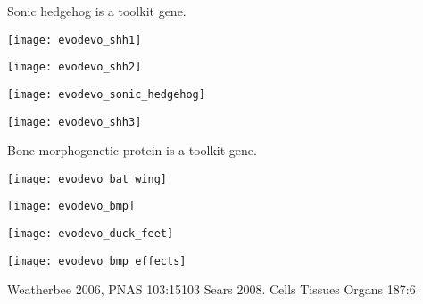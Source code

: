 \documentclass[t]{beamer}
\begin{document}

\begin{frame}{Sonic hedgehog  is a toolkit gene.}

\vspace*{-\baselineskip}

\begin{multicols}{2}

\centering

\texttt{[image: evodevo\_shh1]}

\vspace{0.5ex}

\texttt{[image: evodevo\_shh2]}

\columnbreak

\vspace*{-\baselineskip}

\texttt{[image: evodevo\_sonic\_hedgehog]}

\vspace{0.5ex}

\texttt{[image: evodevo\_shh3]}


\end{multicols}

\end{frame}


\begin{frame}{Bone morphogenetic protein  is a toolkit gene.}

\vspace*{-\baselineskip}

\begin{multicols}{2}

\centering

\texttt{[image: evodevo\_bat\_wing]}

\vspace{0.5ex}

\texttt{[image: evodevo\_bmp]}

\vspace{0.5ex}

\texttt{[image: evodevo\_duck\_feet]}

\columnbreak

\texttt{[image: evodevo\_bmp\_effects]}

\end{multicols}

\vfilll
\tiny Weatherbee 2006, PNAS 103:15103 
\hfill
Sears 2008. Cells Tissues Organs 187:6


\end{frame}
\end{document}
